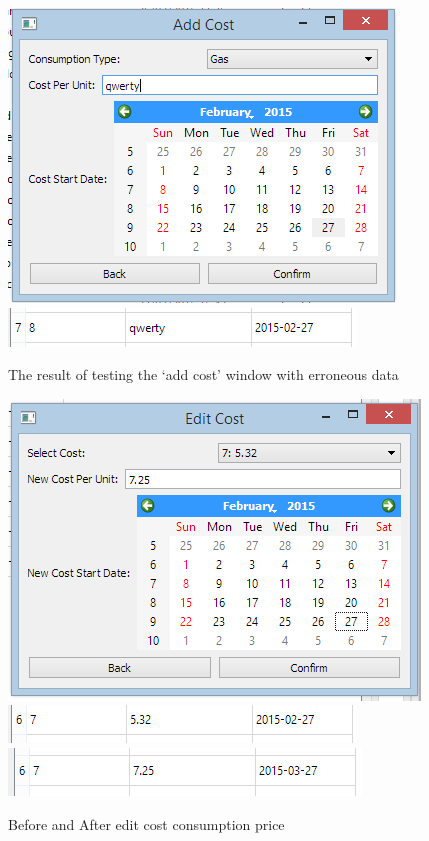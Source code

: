 \begin{figure}[H]
	\includegraphics{./testing/images/test_3_2_add_cost_erroneous_data.png}
	\includegraphics{./testing/images/test_3_2_add_cost_erroneous_added.png}
	\caption{The result of testing the `add cost' window with erroneous data} \label{fig:test_3.2_result}
\end{figure}

\begin{figure}[H]
	\includegraphics{./testing/images/test_3_3_edit_cost_price_data.png}
	\includegraphics{./testing/images/test_3_3_edit_cost_price_before.png}
	\includegraphics{./testing/images/test_3_3_edit_cost_price_after.png}
	\caption{Before and After edit cost consumption price} \label{fig:test_3.3_result}
\end{figure}

